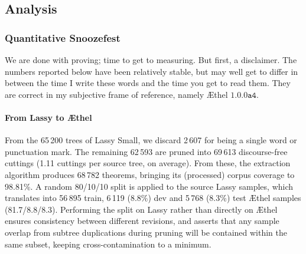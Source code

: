 

\subsection{Analysis}
\subsubsection{Quantitative Snoozefest}
We are done with proving; time to get to measuring.
But first, a disclaimer.
The numbers reported below have been relatively stable, but may well get to differ in between the time I write these words and the time you get to read them.
They are correct in my subjective frame of reference, namely \AE thel $\mathtt{1.0.0a4}$. 

\paragraph{From Lassy to \AE thel}
From the 65\,200 trees of Lassy Small, we discard 2\,607 for being a single word or punctuation mark.
The remaining 62\,593 are pruned into 69\,613 discourse-free cuttings (1.11 cuttings per source tree, on average).
From these, the extraction algorithm produces 68\,782 theorems, bringing its (processed) corpus coverage to 98.81\%.
A random 80/10/10 split is applied to the source Lassy samples, which translates into 56\,895  train, 6\,119 (8.8\%) dev and 5\,768 (8.3\%) test \AE thel samples (81.7/8.8/8.3).
Performing the split on Lassy rather than directly on \AE thel ensures consistency between different revisions, and asserts that any sample overlap from subtree duplications during pruning will be contained within the same subset, keeping cross-contamination to a minimum.


